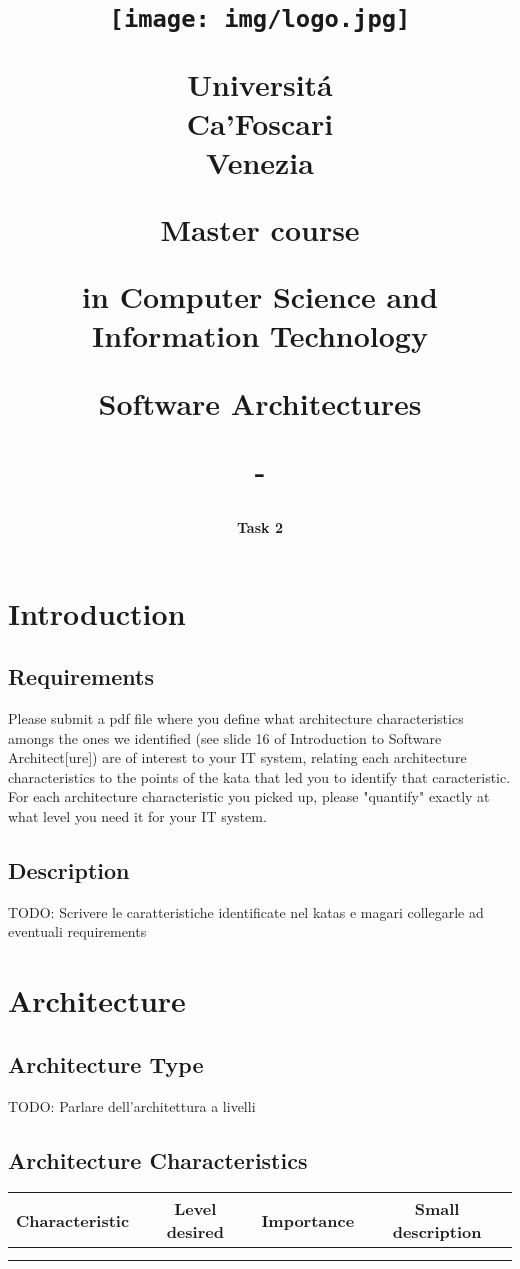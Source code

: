\documentclass[a4paper,11pt]{report}
\title{
	\begin{figure}[!h]
		\vspace{-65mm}  
		\hspace{-30mm}
		\texttt{[image: img/logo.jpg]} \newline
		\hspace{-30mm}
		\label{fig:logo}
	\end{figure}
	\begin{flushleft}
		\vspace{-11mm}  
		\hspace{-30mm}
		\fontfamily{roboto}\selectfont Universit\'{a} \\
		\hspace{-30mm}
		Ca'Foscari\\
		\hspace{-30mm}
		Venezia\\
	\end{flushleft}
	\vspace{25mm}  
	\centerline{Master course}
	\vspace{5mm}
	\centerline{in Computer Science and Information Technology}
	\vspace{30mm}
	\centerline{Software Architectures}
	\vspace{5mm}
	\centerline{-}
}
\author{
	\LARGE \textbf{Task 2} \newline
}
\date{
	\begin{flushleft}
		\vspace{30mm}
		\hspace*{-25mm}
		\textbf{Group 5} \newline
		\hspace*{-25mm}
		Bastianello Lorenzo, 874268\newline
		\hspace*{-25mm} 
		Bonomi Silvia, 867138\newline
		\hspace*{-25mm} 
		Bruno Francesco, 875812\newline
		\hspace*{-25mm} 
		Quaglia Beatrice Maria, 875332\newline
		\vspace{2mm} \newline
		\hspace*{-25mm}
		\textbf{Academic Year} \newline
		\hspace*{-25mm}
		2022 / 2023
	\end{flushleft}
}
\begin{document}
	\maketitle
	\makeatletter
	\chapter*{Introduction}
	\section*{Requirements}
	Please submit a pdf file where you define what architecture characteristics amongs the ones we identified (see slide 16 of Introduction to Software Architect[ure]) are of interest to your IT system, relating each architecture characteristics to the points of the kata that led you to identify that caracteristic. For each architecture characteristic you picked up, please "quantify" exactly at what level you need it for your IT system.
	\section*{Description}
	TODO: Scrivere le caratteristiche identificate nel katas e magari collegarle ad eventuali requirements
	\chapter*{Architecture}
	\section*{Architecture Type}
	TODO: Parlare dell'architettura a livelli
	\section*{Architecture Characteristics}
	\begin{table}[hbt!]
		\centering
		\label{tab:my-table}
		\begin{tabular}{|l|l|l|l|}
			\hline
			\multicolumn{1}{|c|}{\textbf{Characteristic}} & \multicolumn{1}{c|}{\textbf{Level desired}} & \multicolumn{1}{c|}{\textbf{Importance}} & \multicolumn{1}{c|}{\textbf{Small description}} \\ \hline
			&                                             &                                          &                                                 \\ \hline
			&                                             &                                          &                                                 \\ \hline
		\end{tabular}
	\end{table}
\end{document}
